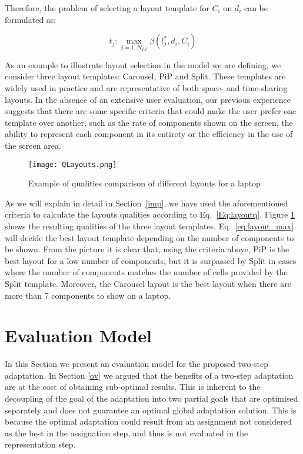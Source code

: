 Therefore, the problem of selecting a layout template for $C_i$ on $d_i$ can be formulated as:

\begin{equation} 
\label{eq:layout_max}
t_j:\max\limits_{j=1..N_{LT}} \beta(l^*_j,d_i,C_i)
\end{equation} 

As an example to illustrate layout selection in the model we are defining, we consider three layout templates: Carousel, PiP and Split. These templates are widely used in practice and are representative of both space- and time-sharing layouts.
In the absence of an extensive user evaluation, our previous experience \cite{Zorrilla2015}  \cite{dominguez2017deployment} suggests that there are some specific criteria that could make the user prefer one template over another, such as the rate of components shown on the screen, the ability to represent each component in its entirety or the efficiency in the use of the screen area. 

\begin{figure}
	\begin{center}
		\texttt{[image: QLayouts.png]}
		\caption{Example of qualities comparison of different layouts for a laptop}
		\label{fig:Qlayouts}
	\end{center}
\end{figure}

As we will explain in detail in Section~\ref{imp}, we have used the aforementioned criteria to calculate the layouts qualities according to Eq.~\ref{Eq:layoutq}. 
Figure \ref{fig:Qlayouts} shows the resulting qualities of the three layout templates.
Eq.~\ref{eq:layout_max} will decide the best layout template depending on the number of components to be shown.
From the picture it is clear that, using the criteria above, PiP is the best layout for a low number of components, but it is surpassed by Split in cases where the number of components matches the number of cells provided by the Split template. 
Moreover, the Carousel layout is the best layout when there are more than 7 components to show on a laptop.


\section{Evaluation Model}

In this Section we present an evaluation model for the proposed two-step adaptation. In Section \ref{ov} we argued that the benefits of a two-step adaptation are at the cost of obtaining sub-optimal results.
This is inherent to the decoupling of the goal of the adaptation into two partial goals that are optimised separately and does not guarantee an optimal global adaptation solution.
This is because the optimal adaptation could result from an assignment not considered as the best in the assignation step, and thus is not evaluated in the representation step.

